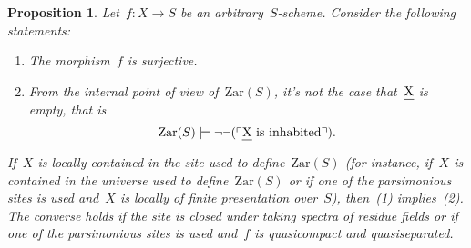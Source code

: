 \documentclass[10pt,reqno,a4paper]{amsbook}
\theoremstyle{definition}
\theoremstyle{plain}
\newtheorem{prop}[defn]{Proposition}
\theoremstyle{remark}
\let\oldul\ul
\renewcommand{\ul}[1]{\text{\oldul{$#1$}}}
\newcommand{\Zar}{\mathrm{Zar}}
\newcommand{\?}{\,{:}\,}
\renewcommand{\_}{\mathpunct{.}\,}
\newcommand{\speak}[1]{\ulcorner\text{\textnormal{#1}}\urcorner}
\begin{document}
\begin{prop}\label{prop:char-surjective-morphisms}
Let~$f : X \to S$ be an arbitrary~$S$-scheme. Consider the following
statements:
\begin{enumerate}
\item The morphism~$f$ is surjective.
\item From the internal point of view of~$\Zar(S)$, it's not the case that~$\ul{X}$ is
empty, that is
\[ \Zar(S) \models \neg\neg(\speak{$\ul{X}$ is inhabited}). \]
\end{enumerate}
If~$X$ is locally contained in the site used to define~$\Zar(S)$ (for instance,
if~$X$ is contained in the universe used to define~$\Zar(S)$ or if one of the
parsimonious sites is used and~$X$ is locally of finite presentation over~$S$),
then~(1) implies~(2). The converse holds if the site is closed under
taking spectra of residue fields or if one of the parsimonious sites is used
and~$f$ is quasicompact and quasiseparated.
\end{prop}
\end{document}
